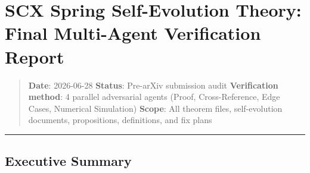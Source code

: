 \documentclass[
  12pt,
]{ctexart}
\author{SCX}
\date{2026}
\begin{document}
\section{SCX Spring Self-Evolution Theory: Final Multi-Agent
Verification
Report}\label{scx-spring-self-evolution-theory-final-multi-agent-verification-report}

\begin{quote}
\textbf{Date}: 2026-06-28 \textbar{} \textbf{Status}: Pre-arXiv
submission audit \textbf{Verification method}: 4 parallel adversarial
agents (Proof, Cross-Reference, Edge Cases, Numerical Simulation)
\textbf{Scope}: All theorem files, self-evolution documents,
propositions, definitions, and fix plans
\end{quote}

\begin{center}\rule{0.5\linewidth}{0.5pt}\end{center}

\subsection{Executive Summary}\label{executive-summary}
\end{document}
